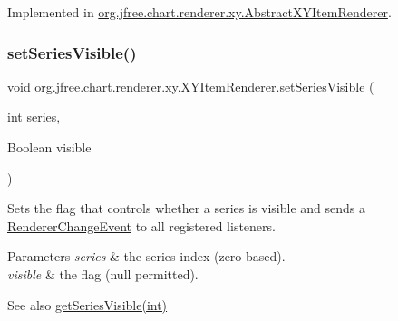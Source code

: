 Implemented in \mbox{\hyperlink{classorg_1_1jfree_1_1chart_1_1renderer_1_1xy_1_1_abstract_x_y_item_renderer_ad8d45b15b9f1e83e417bbf84fb542058}{org.\+jfree.\+chart.\+renderer.\+xy.\+Abstract\+X\+Y\+Item\+Renderer}}.

\mbox{\label{interfaceorg_1_1jfree_1_1chart_1_1renderer_1_1xy_1_1_x_y_item_renderer_a602bc5ae9818a0567f42436dc0560157}} 
\subsubsection{\texorpdfstring{set\+Series\+Visible()}{setSeriesVisible()}\hspace{0.1cm}{\footnotesize\ttfamily [1/4]}}
{\footnotesize\ttfamily void org.\+jfree.\+chart.\+renderer.\+xy.\+X\+Y\+Item\+Renderer.\+set\+Series\+Visible (\begin{DoxyParamCaption}\item[{int}]{series,  }\item[{Boolean}]{visible }\end{DoxyParamCaption})}

Sets the flag that controls whether a series is visible and sends a \mbox{\hyperlink{}{Renderer\+Change\+Event}} to all registered listeners.


\begin{DoxyParams}{Parameters}
{\em series} & the series index (zero-\/based). \\
\hline
{\em visible} & the flag ({\ttfamily null} permitted).\\
\hline
\end{DoxyParams}
\begin{DoxySeeAlso}{See also}
\mbox{\hyperlink{interfaceorg_1_1jfree_1_1chart_1_1renderer_1_1xy_1_1_x_y_item_renderer_acb62c922b439c9311e3e71d2d69b0823}{get\+Series\+Visible(int)}} 
\end{DoxySeeAlso}
\mbox{\label{interfaceorg_1_1jfree_1_1chart_1_1renderer_1_1xy_1_1_x_y_item_renderer_aafe35da0d63cf0cb1b68bbf2b4142ce5}} 
